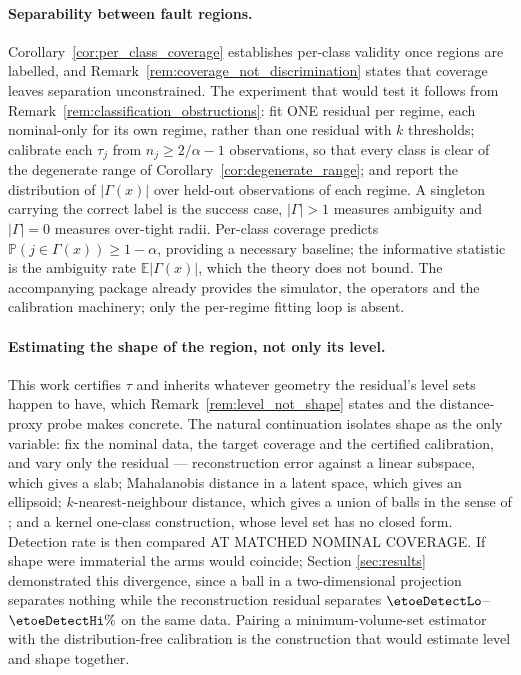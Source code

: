 \documentclass[a4paper]{cas-sc}
\newcommand{\Prob}{\ensuremath{\mathbb{P}}}
\newcommand{\Expect}{\ensuremath{\mathbb{E}}}
\begin{document}
\paragraph{Separability between fault regions.}
Corollary~\ref{cor:per_class_coverage} establishes per-class validity once
regions are labelled, and Remark~\ref{rem:coverage_not_discrimination} states
that coverage leaves separation unconstrained. The experiment that would test
it follows from Remark~\ref{rem:classification_obstructions}: fit ONE residual
per regime, each nominal-only for its own regime, rather than one residual
with \(k\) thresholds; calibrate each \(\tau_j\) from
\(n_j \ge 2/\alpha - 1\) observations, so that every class is clear of the
degenerate range of Corollary~\ref{cor:degenerate_range}; and report the
distribution of \(|\Gamma(x)|\) over held-out observations of each regime.
A singleton carrying the correct label is the success case, \(|\Gamma|>1\)
measures ambiguity and \(|\Gamma|=0\) measures over-tight radii. Per-class
coverage predicts \(\Prob(j \in \Gamma(x)) \ge 1-\alpha\), providing a necessary baseline;
the informative statistic is the ambiguity rate \(\Expect|\Gamma(x)|\),
which the theory does not bound. The accompanying package already provides the
simulator, the operators and the calibration machinery; only the per-regime
fitting loop is absent.

\paragraph{Estimating the shape of the region, not only its level.}
This work certifies \(\tau\) and inherits whatever geometry the residual's
level sets happen to have, which
Remark~\ref{rem:level_not_shape} states and the distance-proxy probe makes
concrete. The natural continuation isolates shape as the only variable: fix
the nominal data, the target coverage and the certified calibration, and vary
only the residual --- reconstruction error against a linear subspace, which
gives a slab; Mahalanobis distance in a latent space, which gives an
ellipsoid; \(k\)-nearest-neighbour distance, which gives a union of balls in
the sense of \citet{devroye1980}; and a kernel one-class construction, whose
level set has no closed form. Detection rate is then compared AT MATCHED
NOMINAL COVERAGE. If shape were immaterial the arms would coincide; Section
\ref{sec:results} demonstrated this divergence, since a ball in a two-dimensional
projection separates nothing while the reconstruction residual separates
\(\etoeDetectLo\)--\(\etoeDetectHi\%\) on the same data. Pairing a
minimum-volume-set estimator with the distribution-free calibration is the
construction that would estimate level and shape together.
\end{document}
